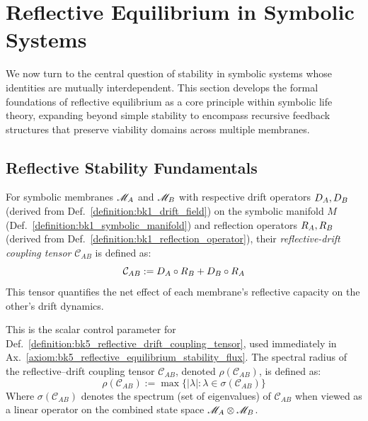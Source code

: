 \section{Reflective Equilibrium in Symbolic Systems}
\label{sec:bk5_reflective_equilibrium_in_symbolic_systems}
We now turn to the central question of stability in symbolic systems whose identities are mutually interdependent. This section develops the formal foundations of reflective equilibrium as a core principle within symbolic life theory, expanding beyond simple stability to encompass recursive feedback structures that preserve viability domains across multiple membranes.
\subsection{Reflective Stability Fundamentals}
\label{subsec:bk5_reflective_stability_fundamentals}
\begin{definition} \label{definition:bk5_reflective_drift_coupling_tensor}
For symbolic membranes $\mathscr{M}_A$ and $\mathscr{M}_B$ with respective drift operators $D_A, D_B$ (derived from Def.~\ref{definition:bk1_drift_field}) on the symbolic manifold $M$ (Def.~\ref{definition:bk1_symbolic_manifold}) and reflection operators $R_A, R_B$ (derived from Def.~\ref{definition:bk1_reflection_operator}), their \emph{reflective-drift coupling tensor} $\mathcal{C}_{AB}$ is defined as:
\begin{equation}
\mathcal{C}_{AB} := D_A \circ R_B + D_B \circ R_A
\end{equation}
This tensor quantifies the net effect of each membrane's reflective capacity on the other's drift dynamics.
\end{definition}
\begin{definition} \label{definition:bk5_spectral_radius_of_coupl}
This is the scalar control parameter for Def.~\ref{definition:bk5_reflective_drift_coupling_tensor}, used immediately in Ax.~\ref{axiom:bk5_reflective_equilibrium_stability_flux}.
The spectral radius of the reflective–drift coupling tensor \( \mathcal{C}_{AB} \), denoted \( \rho(\mathcal{C}_{AB}) \), is defined as:
\begin{equation}
\rho(\mathcal{C}_{AB}) := \max\{|\lambda| : \lambda \in \sigma(\mathcal{C}_{AB})\}
\end{equation}
Where $\sigma(\mathcal{C}_{AB})$ denotes the spectrum (set of eigenvalues) of $\mathcal{C}_{AB}$ when viewed as a linear operator on the combined state space $\mathscr{M}_A \otimes \mathscr{M}_B$.
\end{definition}
